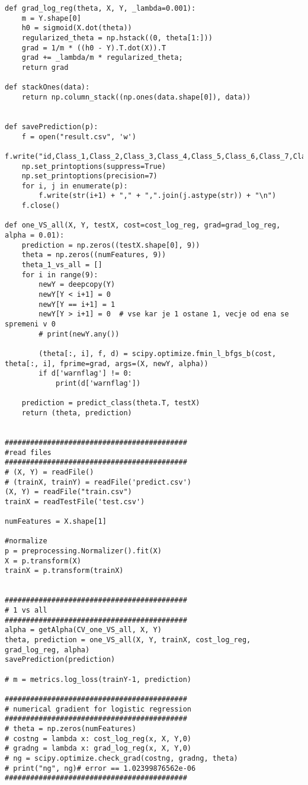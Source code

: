 \documentclass[a4paper,11pt]{article}
\begin{document}
\begin{lstlisting}
def grad_log_reg(theta, X, Y, _lambda=0.001):
    m = Y.shape[0]
    h0 = sigmoid(X.dot(theta))
    regularized_theta = np.hstack((0, theta[1:]))
    grad = 1/m * ((h0 - Y).T.dot(X)).T
    grad += _lambda/m * regularized_theta;
    return grad

def stackOnes(data):
    return np.column_stack((np.ones(data.shape[0]), data))


def savePrediction(p):
    f = open("result.csv", 'w')
    f.write("id,Class_1,Class_2,Class_3,Class_4,Class_5,Class_6,Class_7,Class_8,Class_9\n")
    np.set_printoptions(suppress=True)
    np.set_printoptions(precision=7)
    for i, j in enumerate(p):
        f.write(str(i+1) + "," + ",".join(j.astype(str)) + "\n")
    f.close()

def one_VS_all(X, Y, testX, cost=cost_log_reg, grad=grad_log_reg, alpha = 0.01):
    prediction = np.zeros((testX.shape[0], 9))
    theta = np.zeros((numFeatures, 9))
    theta_1_vs_all = []
    for i in range(9):
        newY = deepcopy(Y)
        newY[Y < i+1] = 0
        newY[Y == i+1] = 1
        newY[Y > i+1] = 0  # vse kar je 1 ostane 1, vecje od ena se spremeni v 0
        # print(newY.any())

        (theta[:, i], f, d) = scipy.optimize.fmin_l_bfgs_b(cost, theta[:, i], fprime=grad, args=(X, newY, alpha))
        if d['warnflag'] != 0:
            print(d['warnflag'])

    prediction = predict_class(theta.T, testX)
    return (theta, prediction)


###########################################
#read files
###########################################
# (X, Y) = readFile()
# (trainX, trainY) = readFile('predict.csv')
(X, Y) = readFile("train.csv")
trainX = readTestFile('test.csv')

numFeatures = X.shape[1]

#normalize
p = preprocessing.Normalizer().fit(X)
X = p.transform(X)
trainX = p.transform(trainX)


###########################################
# 1 vs all
###########################################
alpha = getAlpha(CV_one_VS_all, X, Y)
theta, prediction = one_VS_all(X, Y, trainX, cost_log_reg, grad_log_reg, alpha)
savePrediction(prediction)

# m = metrics.log_loss(trainY-1, prediction)

###########################################
# numerical gradient for logistic regression
###########################################
# theta = np.zeros(numFeatures)
# costng = lambda x: cost_log_reg(x, X, Y,0)
# gradng = lambda x: grad_log_reg(x, X, Y,0)
# ng = scipy.optimize.check_grad(costng, gradng, theta)
# print("ng", ng)# error == 1.02399876562e-06
###########################################



\end{lstlisting}
\end{document}
